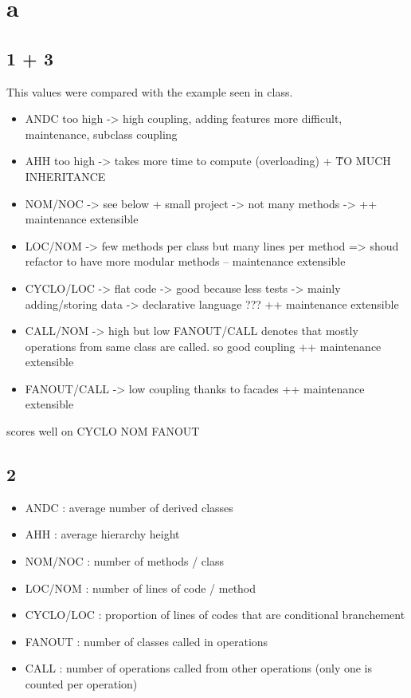 \section{a}

\subsection{1 + 3}

This values were compared with the example seen in class.

\begin{itemize}
    \item ANDC too high -> high coupling, adding features more difficult, maintenance, subclass coupling
    \item AHH too high -> takes more time to compute (overloading) + \^ TO MUCH INHERITANCE
    \item NOM/NOC -> see below + small project -> not many methods -> ++ maintenance extensible
    \item LOC/NOM -> few methods per class but many lines per method => shoud refactor to have more modular methods -- maintenance extensible
    \item CYCLO/LOC -> flat code -> good because less tests -> mainly adding/storing data -> declarative language ??? ++ maintenance extensible
    \item CALL/NOM -> high but low FANOUT/CALL denotes that mostly operations from same class are called. so good coupling ++ maintenance extensible
    \item FANOUT/CALL -> low coupling thanks to facades ++ maintenance extensible
\end{itemize}

scores well on CYCLO NOM FANOUT

\subsection{2}
\begin{itemize}
    \item ANDC : average number of derived classes
    \item AHH : average hierarchy height
    \item NOM/NOC : number of methods / class
    \item LOC/NOM : number of lines of code / method
    \item CYCLO/LOC : proportion of lines of codes that are conditional branchement
    \item FANOUT : number of classes called in operations
    \item CALL : number of operations called from other operations (only one is counted per operation)
\end{itemize}

